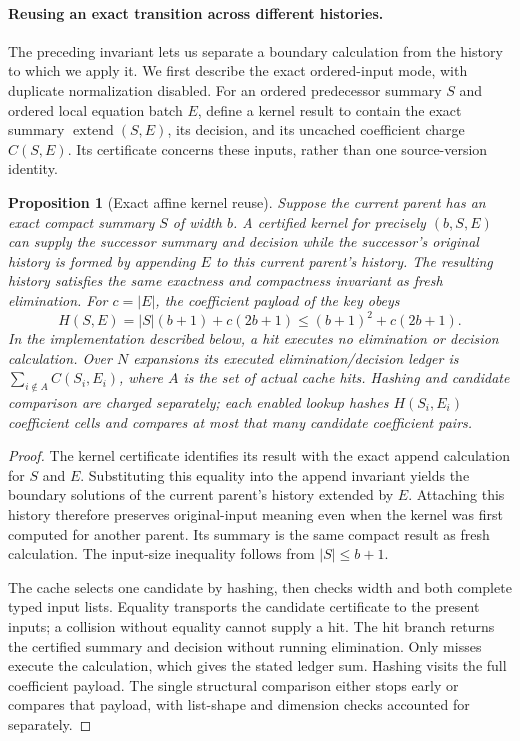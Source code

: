 \documentclass[11pt,a4paper]{article}
\numberwithin{equation}{section}
\theoremstyle{plain}
\newtheorem{proposition}[lemma]{Proposition}
\theoremstyle{definition}
\theoremstyle{remark}
\begin{document}
\paragraph{Reusing an exact transition across different histories.}
The preceding invariant lets us separate a boundary calculation from the history to which we apply it. We first describe the exact ordered-input mode, with duplicate normalization disabled. For an ordered predecessor summary $S$ and ordered local equation batch $E$, define a kernel result to contain the exact summary $\operatorname{extend}(S,E)$, its decision, and its uncached coefficient charge $C(S,E)$. Its certificate concerns these inputs, rather than one source-version identity.

\begin{proposition}[Exact affine kernel reuse]
\label{prop:affine-kernel-reuse}
Suppose the current parent has an exact compact summary $S$ of width $b$. A certified kernel for precisely $(b,S,E)$ can supply the successor summary and decision while the successor's original history is formed by appending $E$ to this current parent's history. The resulting history satisfies the same exactness and compactness invariant as fresh elimination. For $c=|E|$, the coefficient payload of the key obeys
\[
H(S,E)=|S|(b+1)+c(2b+1)\leq (b+1)^2+c(2b+1).
\]
In the implementation described below, a hit executes no elimination or decision calculation. Over $N$ expansions its executed elimination/decision ledger is $\sum_{i\notin A} C(S_i,E_i)$, where $A$ is the set of actual cache hits. Hashing and candidate comparison are charged separately; each enabled lookup hashes $H(S_i,E_i)$ coefficient cells and compares at most that many candidate coefficient pairs.
\end{proposition}
\begin{proof}
The kernel certificate identifies its result with the exact append calculation for $S$ and $E$. Substituting this equality into the append invariant yields the boundary solutions of the current parent's history extended by $E$. Attaching this history therefore preserves original-input meaning even when the kernel was first computed for another parent. Its summary is the same compact result as fresh calculation. The input-size inequality follows from $|S|\leq b+1$.

The cache selects one candidate by hashing, then checks width and both complete typed input lists. Equality transports the candidate certificate to the present inputs; a collision without equality cannot supply a hit. The hit branch returns the certified summary and decision without running elimination. Only misses execute the calculation, which gives the stated ledger sum. Hashing visits the full coefficient payload. The single structural comparison either stops early or compares that payload, with list-shape and dimension checks accounted for separately.
\end{proof}
\end{document}
